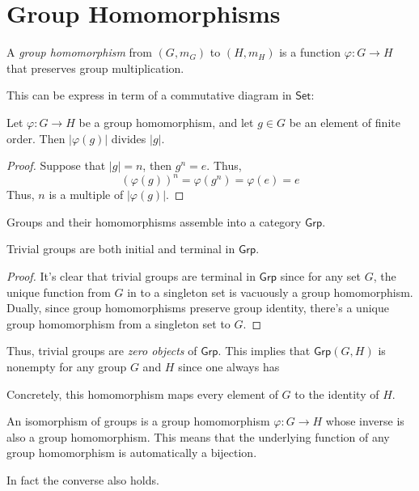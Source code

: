 \documentclass{amsart}
\begin{document}
\section{Group Homomorphisms}
\label{sec:group-homomorphisms}

\begin{defn}
  A \emph{group homomorphism} from $(G,m_{G})$ to $(H,m_{H})$ is a function $\varphi : G \to H$ that preserves group multiplication.
\end{defn}
This can be express in term of a commutative diagram in $\mathsf{Set}$:
  \begin{equation}
    \label{eq:group-homomorphism}
    
  \end{equation}

\begin{lem}
  Let $\varphi : G \to H$ be a group homomorphism, and let $g \in G$ be an element of finite order.
  Then $|\varphi(g)|$ divides $|g|$.
\end{lem}
\begin{proof}
  Suppose that $|g| = n$, then $g^{n} = e$.
  Thus,
  \[
    (\varphi(g))^{n} = \varphi(g^{n}) = \varphi(e) = e
  \]
  Thus, $n$ is a multiple of $|\varphi(g)|$.
\end{proof}

\begin{lem}
  Groups and their homomorphisms assemble into a category $\mathsf{Grp}$.
\end{lem}

\begin{lem}
  Trivial groups are both initial and terminal in $\mathsf{Grp}$.
\end{lem}
\begin{proof}
  It's clear that trivial groups are terminal in $\mathsf{Grp}$ since for any set $G$, the unique function from $G$ in to a singleton set is vacuously a group homomorphism.
  Dually, since group homomorphisms preserve group identity, there's a unique group homomorphism from a singleton set to $G$.
\end{proof}

Thus, trivial groups are \emph{zero objects} of $\mathsf{Grp}$.
This implies that $\mathsf{Grp}(G,H)$ is nonempty for any group $G$ and $H$ since one always has

Concretely, this homomorphism maps every element of $G$ to the identity of $H$.

\begin{defn}
  An isomorphism of groups is a group homomorphism $\varphi : G \to H$ whose inverse is also a group homomorphism.
  This means that the underlying function of any group homomorphism is automatically a bijection.
\end{defn}
In fact the converse also holds.
\end{document}

